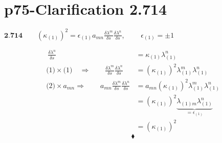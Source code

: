 \section{p75-Clarification 2.714}
\begin{tcolorbox}
$\textbf{2.714} \quad \quad (\kappa_{(1)})^2 = \epsilon_{(1)} a_{mn} \frac{\delta \lambda^{m}}{\delta s} \frac{\delta \lambda^{n}}{\delta s}$,   $\quad \quad \epsilon_{(1)} = \pm 1$
\end{tcolorbox}
\begin{align}
\ \frac{\delta \lambda^{n}}{\delta s} &= \kappa_{(1)}\lambda_{(1)}^{n}\\
\text{(1)}\times \text{(1)}\quad\Rightarrow \quad\quad \frac{\delta \lambda^{m}}{\delta s}\frac{\delta \lambda^{n}}{\delta s} &= (\kappa_{(1)})^2 \lambda_{(1)}^{m}\lambda_{(1)}^{n}\\
\text{(2)}\times a_{mn} \Rightarrow\quad\quad a_{mn}\frac{\delta \lambda^{m}}{\delta s}\frac{\delta \lambda^{n}}{\delta s} &= a_{mn}(\kappa_{(1)})^2 \lambda_{(1)}^{m}\lambda_{(1)}^{n}\\
\ &= (\kappa_{(1)})^2 \underbrace{\lambda_{(1)m} \lambda_{(1)}^{n}}_{=\epsilon_{(1)}}\\
\ &= (\kappa_{(1)})^2 
\end{align}
$$\blacklozenge$$
\newpage


